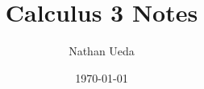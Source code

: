 \documentclass[11pt]{article}
\title{Calculus 3 Notes}
\author{Nathan Ueda}
\date{\today}
\begin{document}
\maketitle 
\pagebreak
\tableofcontents 
\pagebreak
\end{document}
